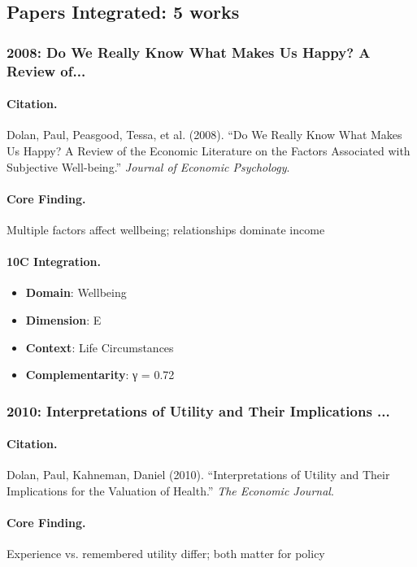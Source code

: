 \subsection{Papers Integrated: 5 works}

\subsubsection{2008: Do We Really Know What Makes Us Happy? A Review of...}

\paragraph{Citation.}
Dolan, Paul, Peasgood, Tessa, et al. (2008). ``Do We Really Know What Makes Us Happy? A Review of the Economic Literature on the Factors Associated with Subjective Well-being.''
\textit{Journal of Economic Psychology}.

\paragraph{Core Finding.}
Multiple factors affect wellbeing; relationships dominate income

\paragraph{10C Integration.}
\begin{itemize}[nosep]
  \item \textbf{Domain}: Wellbeing
  \item \textbf{Dimension}: E
  \item \textbf{Context}: Life Circumstances
  \item \textbf{Complementarity}: γ = 0.72
\end{itemize}

\subsubsection{2010: Interpretations of Utility and Their Implications ...}

\paragraph{Citation.}
Dolan, Paul, Kahneman, Daniel (2010). ``Interpretations of Utility and Their Implications for the Valuation of Health.''
\textit{The Economic Journal}.

\paragraph{Core Finding.}
Experience vs. remembered utility differ; both matter for policy

